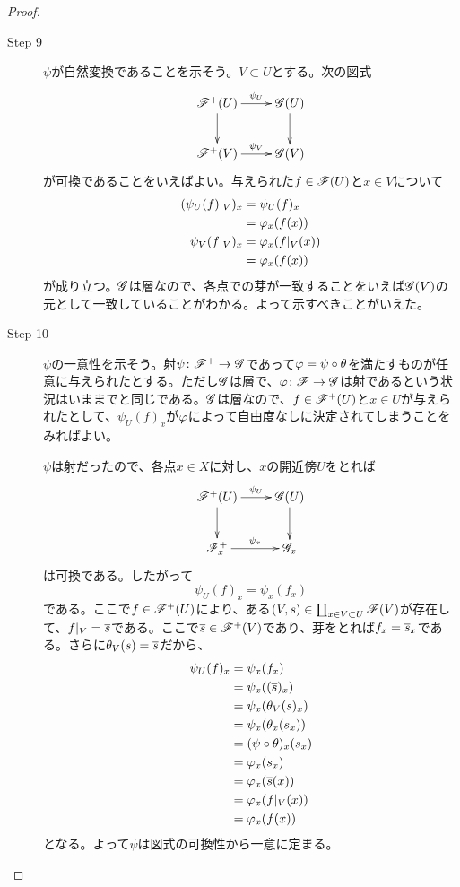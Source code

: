 \begin{proof}
\begin{description}
\item[Step 9] $\psi$が自然変換であることを示そう。$V \subset U$とする。次の図式
\[
\xymatrix{
\scrf^+(U) \ar[r]^-{\psi_U} \ar[d] & \scrg(U) \ar[d] \\
\scrf^+(V) \ar[r]^-{\psi_V} & \scrg(V)
}
\]
が可換であることをいえばよい。与えられた$f \in \mathscr{F}(U)$と$x \in V$について
\begin{align*}
  (\psi_U(f)|_V)_x &= \psi_U(f)_x \\
  &= {\varphi}_x(f(x)) \\
  \psi_V(f|_V)_x &= {\varphi}_x (f|_V (x)) \\
  &= {\varphi}_x(f(x))
\end{align*}
が成り立つ。$\mathscr{G}$は層なので、各点での芽が一致することをいえば$\mathscr{G}(V)$の元として一致していることがわかる。よって示すべきことがいえた。
\item[Step 10] $\psi$の一意性を示そう。射$\psi \colon \mathscr{F}^+ \to \mathscr{G}$であって${\varphi} = \psi \circ {\theta}$を満たすものが任意に与えられたとする。ただし$\mathscr{G}$は層で、${\varphi} \colon \mathscr{F} \to \mathscr{G}$は射であるという状況はいままでと同じである。$\mathscr{G}$は層なので、$f \in \mathscr{F}^+(U)$と$x \in U$が与えられたとして、$\psi_U(f)_x$が${\varphi}$によって自由度なしに決定されてしまうことをみればよい。

$\psi$は射だったので、各点$x \in X$に対し、$x$の開近傍$U$をとれば
\[
\xymatrix{
\scrf^+(U) \ar[r]^-{\psi_U} \ar[d] & \scrg(U) \ar[d] \\
\scrf^+_x \ar[r]^-{\psi_x} & \scrg_x
}
\]
は可換である。したがって
\[
\psi_U(f)_x = \psi_x(f_x)
\]
である。ここで$f \in \mathscr{F}^+(U)$により、ある$(V,s) \in \coprod_{x \in V \subset U} \mathscr{F}(V)$が存在して、$f|_V = \overline{s}$である。ここで$\overline{s} \in \mathscr{F}^+(V)$であり、芽をとれば$f_x = \overline{s}_x$である。さらに${\theta}_V(s) = \overline{s}$だから、
\begin{align*}
  \psi_U(f)_x &= \psi_x(f_x) \\
  &= \psi_x((\overline{s})_x ) \\
  &= \psi_x ({\theta}_V(s)_x ) \\
  &= \psi_x ({\theta}_x (s_x) ) \\
  &= (\psi \circ {\theta} )_x (s_x) \\
  &= {\varphi}_x (s_x) \\
  &= {\varphi}_x ( \overline{s} (x) ) \\
  &= {\varphi}_x (f|_V (x)) \\
  &= {\varphi}_x (f(x))
\end{align*}
となる。よって$\psi$は図式の可換性から一意に定まる。
\end{description}

\end{proof}





